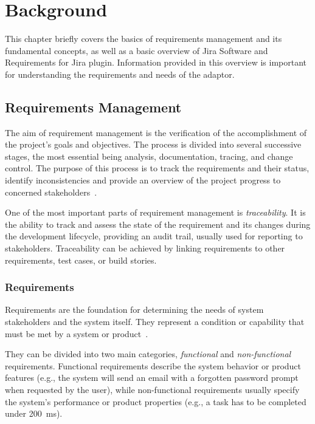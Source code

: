 
\chapter{Background}
This chapter briefly covers the basics of requirements management and its fundamental concepts, as well as a basic overview of Jira Software and Requirements for Jira plugin. Information provided in this overview is important for understanding the requirements and needs of the adaptor.

\section{Requirements Management}
The aim of requirement management is the verification of the accomplishment of the project's goals and objectives. The process is divided into several successive stages, the most essential being analysis, documentation, tracing, and change control. The purpose of this process is to track the requirements and their status, identify inconsistencies and provide an overview of the project progress to concerned stakeholders \cite{requirements_management}.

One of the most important parts of requirement management is \emph{traceability}. It is the ability to track and assess the state of the requirement and its changes during the development lifecycle, providing an audit trail, usually used for reporting to stakeholders. Traceability can be achieved by linking requirements to other requirements, test cases, or build stories.

\subsection*{Requirements}
\label{sec:requirements}
Requirements are the foundation for determining the needs of system stakeholders and the system itself. They represent a condition or capability
that must be met by a system or product \cite{IEEE_24765-2017}.

They can be divided into two main categories, \emph{functional} and \emph{non-functional} requirements. Functional requirements describe the system behavior or product features (e.g., the system will send an email with a forgotten password prompt when requested by the user), while non-functional requirements usually specify the system's performance or product properties (e.g., a task has to be completed under 200 ms).


